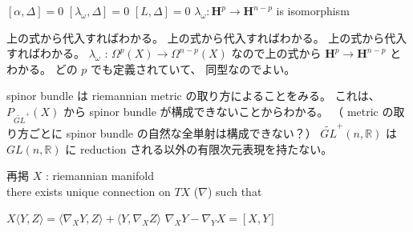 \begin{Theorem}
\itemprop
  \([\alpha , \Delta] = 0\)
\itemprop
  \([\lambda_{\omega} , \Delta] = 0\)
\itemprop
  \([L , \Delta] = 0\)
\itemprop
  \(\lambda_{\omega} : \mathbf{H}^p \to \mathbf{H}^{n-p}\) is isomorphism
\end{Theorem}

\begin{Proof}
\itemprof
  上の式から代入すればわかる。
\itemprof
  上の式から代入すればわかる。
\itemprof
  上の式から代入すればわかる。
\itemprof
  \(\lambda_{\omega}\) : \(\Omega^p(X) \to \Omega^{n-p}(X)\) なので上の式から \(\mathbf{H}^p \to \mathbf{H}^{n-p}\) とわかる。
  どの \(p\) でも定義されていて、 同型なのでよい。
\end{Proof}

\begin{Theorem}
\itemnote
  spinor bundle は riemannian metric の取り方によることをみる。
  これは、 \(P_{\tilde{GL}^+}(X)\) から spinor bundle が構成できないことからわかる。
  （ metric の取り方ごとに spinor bundle の自然な全単射は構成できない？）
\itemprop
  \(\tilde{GL}^+(n , \mathbb{R})\) は \(GL(n , \mathbb{R})\) に reduction される以外の有限次元表現を持たない。
\end{Theorem}

\begin{Theorem}
\itemnote
  再掲
\itemprop
  \For \(X\) : riemannian manifold \\
  there exists unique connection on \(TX\) (\(\nabla\)) such that
  \begin{itemize}
    \itemenum \(X \langle Y , Z \rangle = \langle \nabla_X Y , Z \rangle + \langle Y , \nabla_X Z \rangle\)
    \itemenum \(\nabla_X Y - \nabla_Y X = [X , Y]\)
  \end{itemize}
\end{Theorem}

